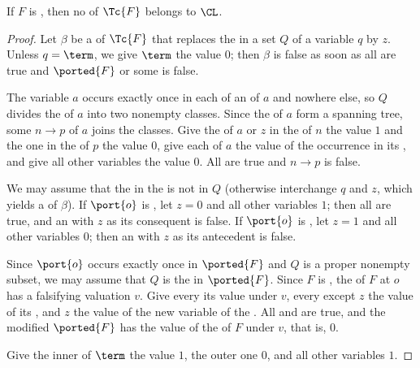 \begin{lemma}\label{lem:M-split}
If $F$ is , then no  of $\Tc{F}$ belongs
to $\CL$.
\end{lemma}
\begin{proof}
Let $\beta$ be a  of $\Tc{F}$ that replaces the
 in a set $Q$ of a variable $q$ by $z$. Unless $q=\term$,
we give $\term$ the value $0$; then $\beta$ is false as soon as all
 are true and $\ported{F}$ or some  is false.

The variable $a$ occurs exactly once in each  of an
 of $a$ and nowhere else, so $Q$ divides the  of
$a$ into two nonempty classes. Since the  of $a$ form a
spanning tree, some  $n\to p$ of $a$ joins the classes. Give
the  of $a$ or $z$ in the  of $n$ the value $1$
and the one in the  of $p$ the value $0$, give each  of
$a$ the value of the  occurrence in its , and give all
other variables the value $0$. All  are true and $n\to p$ is
false.

We may assume that the  in the  is not in $Q$
(otherwise interchange $q$ and $z$, which yields a  of
$\beta$). If $\port{o}$ is , let $z=0$ and all other variables
$1$; then all  are true, and an  with $z$ as
its consequent is false. If $\port{o}$ is , let $z=1$ and all
other variables $0$; then an  with $z$ as its antecedent is
false.

Since $\port{o}$ occurs exactly once in $\ported{F}$ and $Q$ is a proper
nonempty subset, we may assume that $Q$ is the  in
$\ported{F}$. Since $F$ is , the  of
$F$ at $o$ has a falsifying valuation $v$. Give every  its value
under $v$, every  except $z$ the value of its , and $z$
the value of the new variable of the . All  and
 are true, and the modified $\ported{F}$ has the value of
the  of $F$ under $v$, that is, $0$.

Give the inner  of $\term$ the value $1$, the outer one $0$,
and all other variables $1$.
\end{proof}

